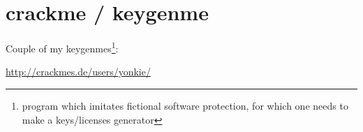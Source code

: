 \section{crackme / keygenme}

{Couple of my keygenmes\footnote{program which imitates fictional software protection, 
for which one needs to make a keys/licenses generator}:}

\url{http://crackmes.de/users/yonkie/}

